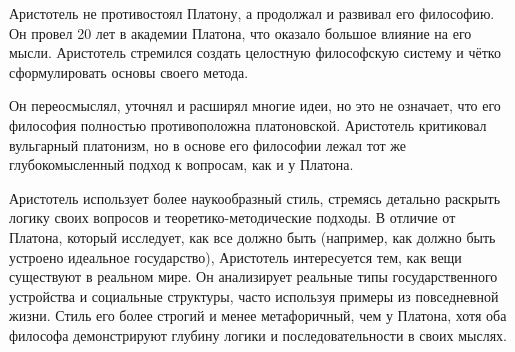 Аристотель не противостоял Платону, а продолжал и развивал его философию. Он провел 20 лет в академии Платона, что оказало большое влияние на его мысли. Аристотель стремился создать целостную философскую систему и чётко сформулировать основы своего метода. 

Он переосмыслял, уточнял и расширял многие идеи, но это не означает, что его философия полностью противоположна платоновской. Аристотель критиковал вульгарный платонизм, но в основе его философии лежал тот же глубокомысленный подход к вопросам, как и у Платона.


Аристотель использует более наукообразный стиль, стремясь детально раскрыть логику своих вопросов и теоретико-методические подходы. В отличие от Платона, который исследует, как все должно быть (например, как должно быть устроено идеальное государство), Аристотель интересуется тем, как вещи существуют в реальном мире. Он анализирует реальные типы государственного устройства и социальные структуры, часто используя примеры из повседневной жизни. Стиль его более строгий и менее метафоричный, чем у Платона, хотя оба философа демонстрируют глубину логики и последовательности в своих мыслях.

